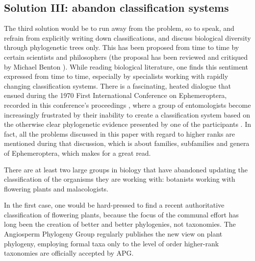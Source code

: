 \begin{artengenv}
\subsection{Solution III: abandon classification systems}

The third solution would be to run away from the problem, so to speak, and refrain from explicitly writing down
classifications, and discuss biological diversity through phylogenetic trees only. This has been proposed from time to
time by certain scientists and philosophers (the proposal has been reviewed and critiqued by Michael Benton
\parencite*{benton_stems_2000}).
While reading biological literature, one finds this sentiment expressed from time to
time, especially by specialists working with rapidly changing classification systems. There is a fascinating, heated
dialogue that ensued during the 1970 First International Conference on Ephemeroptera, recorded in this conference’s
proceedings
\parencite[pp.151–154]{peters_proceedings_1973},
where a group of entomologists become
increasingly frustrated by their inability to create a classification system based on the otherwise clear phylogenetic
evidence presented by one of the participants
\parencite{edmunds_jr_critical_1973}.
In fact, all the problems
discussed in this paper with regard to higher ranks are mentioned during that discussion, which is about families,
subfamilies and genera of Ephemeroptera, which makes for a great read.

There are at least two large groups in biology that have abandoned updating the classification of the organisms they are
working with: botanists working with flowering plants and malacologists.

In the first case, one would be hard-pressed to find a recent authoritative classification of flowering plants, because
the focus of the communal effort has long been the creation of better and better phylogenies, not taxonomies. The
Angiosperm Phylogeny Group regularly publishes the new view on plant phylogeny, employing formal taxa only to the level
of order %
higher-rank taxonomies are officially accepted by APG.


\end{artengenv}
